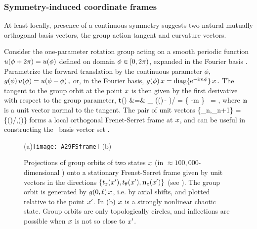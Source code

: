 \subsubsection{Symmetry-induced coordinate frames}
\label{s:symmIndCoo}

At least locally, presence of a continuous symmetry suggests two
natural mutually orthogonal basis vectors, the group action tangent and
curvature vectors.

Consider the one-parameter rotation group  acting on a smooth
periodic function $u({\bf \phi} + 2\pi) = u({\bf \phi})$ defined on domain
${\bf \phi} \in [0,2\pi)$, expanded in the Fourier basis
.
Parametrize the forward
translation by the continuous parameter $\phi$,
\(
    g(\phi)\,u({\bf \phi}) = u({\bf \phi}-\phi)
\,,
\)
or, in the Fourier basis,
\(
   g(\phi) \,x = \mathrm{diag}\{ \mathrm{e}^{-\mathrm{i}m\phi} \} \,x
\,.
\)
The tangent to the group orbit at the point $\ssp$ is then given by
the first derivative with respect to the group parameter,
\bea
   {\bf t}(\ssp) &=&
   \lim_{\gSpace{}}
   \left(\LieEl(\gSpace)\,\ssp - \ssp\right)/\gSpace
   = \{ -m \} \, \ssp = \Lg \ssp,
\label{eq:tang}
\eea
where $\mathbf{n}$ is a unit vector normal to the tangent. The pair of unit vectors
    \PC{2011-10-28
    ``As $\Norm{\LieEl(\gSpace)\slicep}$ is a constant, for the group tangent
    vector $\Lg_\gSpace \slicep$ evaluated at $\slicep$ \refeq{eq:tang}
    $\braket{\slicep}{\Lg_\theta\,\slicep}$ vanishes ($\Lg_{\theta}$ is
    antisymmetric).''
The state vector $\ssp$ is not normal to \normVec(\ssp), as $\braket{\ssp
\Lg^2}{\ssp} = - \Norm{\groupTan(\ssp)}^2 \neq 0$, but can one use it to
produce from $\ssp$ the 3. local eigenbasis unit vector? Have not thought
that through. If we do that here, need to rewrite text leading to
\refeq{PCsectQ0}.
    }
\beq
\{{\be_n},{\be_{n+1}}\} =
\{\groupTan(\ssp)/\Norm{\groupTan(\ssp)},\normVec(\ssp)\}
forms a local orthogonal Frenet-Serret frame at $\ssp$, and can be useful
in constructing the \statesp\ basis vector set .

\begin{figure}
  \centering
(a)\texttt{[image: A29FSframe]}
(b)%
  \caption{\label{fig:2840GOt135th0}
Projections of group orbits of two states $\ssp$ (in $\approx
100,000$-dimensional {\statesp}) onto a stationary Frenet-Serret frame
given by unit vectors in the directions
$\{t_z(x'),t_\theta(x'),\mathbf{n}_z(x')\}$ (see
). The group orbit is generated by
$g(0,\ell)\,x$, i.e. by axial shifts, and plotted relative to the
point $x'$.
In  (b) $\ssp$ is a strongly nonlinear chaotic state.
Group orbits are only topologically circles, and inflections are possible
when $\ssp$ is not so close to $x'$.
  }
\end{figure}

